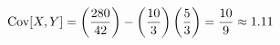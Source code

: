 \documentclass[12pt]{article}
\newenvironment{bluetext}
    {\par\begingroup\color{blue}\parindent=0pt\ignorespaces}
    {\par\endgroup\noindent\ignorespacesafterend}
\begin{document}
\begin{enumerate}
\begin{bluetext}
\[
\mathrm{Cov}[X,Y]=\left(\frac{280}{42}\right)-\left(\frac{10}{3}\right)\left(\frac{5}{3}\right)=\frac{10}{9}\approx1.11\\
\]        
        
    \end{bluetext}
\end{enumerate}
\end{document}
